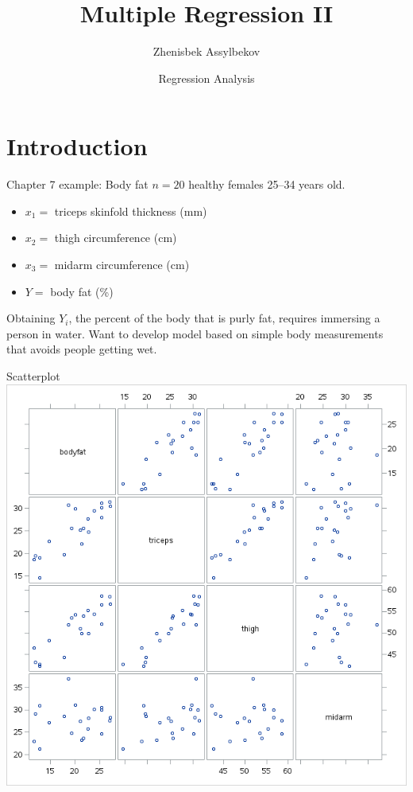 \documentclass{beamer}
\title{Multiple Regression II}
\author{Zhenisbek Assylbekov}
\institute{Department of Mathematics}
\date{Regression Analysis}
\begin{document}
\begin{frame}
  \titlepage
\end{frame}

\section{Introduction}

\begin{frame}{Chapter 7 example: Body fat}
$n=20$ healthy females 25--34 years old.
\begin{itemize}
\item $x_1=$ triceps skinfold thickness (mm)
\item $x_2=$ thigh circumference (cm)
\item $x_3=$ midarm circumference (cm)
\item $Y=$ body fat (\%)
\end{itemize}

Obtaining $Y_i$, the percent of the body that is purly fat, requires
immersing a person in water. Want to develop model based on simple body measurements that avoids people getting wet.
\end{frame}

\begin{frame}{Scatterplot}
\centering\includegraphics[scale=0.45]{plots/scatterplot}
\end{frame}
\end{document}
